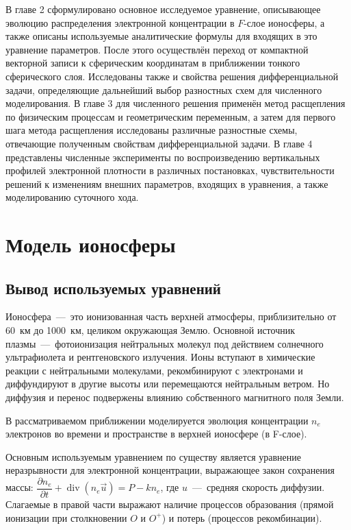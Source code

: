 \documentclass[14pt, a4paper, fleqn]{extarticle}
\renewcommand{\div}{\operatorname{div}}
\begin{document}
В главе 2 сформулировано основное исследуемое уравнение, описывающее эволюцию распределения электронной концентрации в $F$-слое ионосферы, а также описаны используемые аналитические формулы для входящих в это уравнение параметров. После этого осуществлён переход от компактной векторной записи к сферическим координатам в приближении тонкого сферического слоя. Исследованы также и свойства решения дифференциальной задачи, определяющие дальнейший выбор разностных схем для численного моделирования. В главе 3 для численного решения применён метод расщепления по физическим процессам и геометрическим переменным, а затем для первого шага метода расщепления исследованы различные разностные схемы, отвечающие полученным свойствам дифференциальной задачи. В главе 4 представлены численные эксперименты по воспроизведению вертикальных профилей электронной плотности в различных постановках, чувствительности решений к изменениям внешних параметров, входящих в уравнения, а также моделированию суточного хода.

\section{Модель ионосферы}

\subsection{Вывод используемых уравнений}

Ионосфера~---~это ионизованная часть верхней атмосферы, приблизительно от 60~км до 1000~км, целиком окружающая Землю. Основной источник плазмы~---~фотоионизация нейтральных молекул под действием солнечного ультрафиолета и рентгеновского излучения. Ионы вступают в химические реакции с нейтральными молекулами, рекомбинируют с электронами и диффундируют в другие высоты или перемещаются нейтральным ветром. Но диффузия и перенос подвержены влиянию собственного магнитного поля Земли.

\medskip

В рассматриваемом приближении моделируется эволюция концентрации $n_e$ электронов во времени и пространстве в верхней ионосфере (в F-слое).

\medskip

Основным используемым уравнением по существу является уравнение неразрывности для электронной концентрации, выражающее закон сохранения массы: $\dfrac{\partial n_e}{\partial t}+\div(n_e \vec{u})=P-kn_e$, где $u$~---~средняя скорость диффузии. Слагаемые в правой части выражают наличие процессов образования (прямой ионизации при столкновении $O$ и $O^+$) и потерь (процессов рекомбинации).
\end{document}

